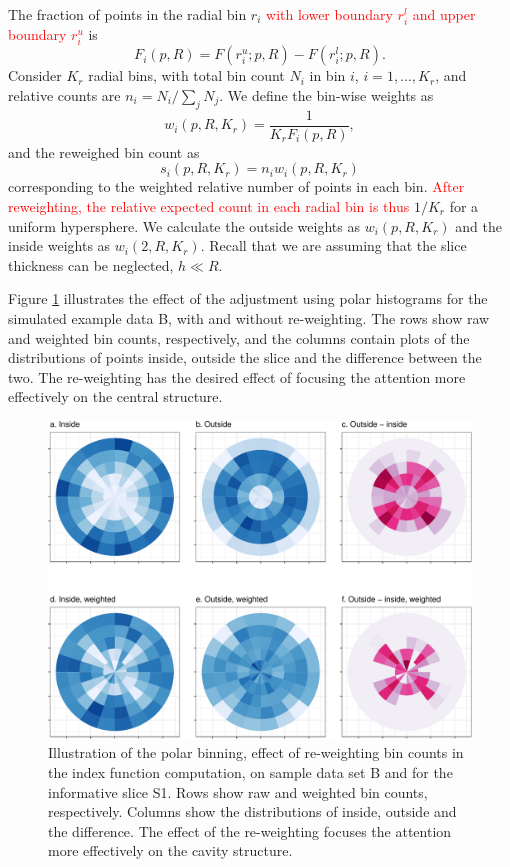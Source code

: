 \documentclass[]{interact}
\theoremstyle{plain}%
\theoremstyle{definition}
\theoremstyle{remark}
\begin{document}
The fraction of points in the radial bin \(r_i\)
\textcolor{red}{with lower boundary $r_i^l$ and upper boundary $r_i^u$}
is \begin{equation}
F_{i}(p, R) = F(r_i^u; p, R) - F(r_i^l; p, R).
\label{eq:frac}
\end{equation} Consider \(K_r\) radial bins, with total bin count
\(N_i\) in bin \(i\), \(i = 1,...,K_r\), and relative counts are
\(n_i = N_i / \sum_j N_j\). We define the bin-wise weights as
\begin{equation}
w_i(p, R, K_r) = \frac{1}{K_r F_i(p,R)},
\end{equation} and the reweighed bin count as \begin{equation}
s_i(p, R, K_r) = n_i w_i(p, R, K_r)
\label{eq:reweight}
\end{equation} corresponding to the weighted relative number of points
in each bin.
\textcolor{red}{After reweighting, the relative expected count in each radial bin is thus}
\(1/K_r\) for a uniform hypersphere. We calculate the outside weights as
\(w_i(p, R, K_r)\) and the inside weights as \(w_i(2, R, K_r)\). Recall
that we are assuming that the slice thickness can be neglected,
\(h\ll R\).

Figure \ref{fig:data_and_densities} illustrates the effect of the
adjustment using polar histograms for the simulated example data B, with
and without re-weighting. The rows show raw and weighted bin counts,
respectively, and the columns contain plots of the distributions of
points inside, outside the slice and the difference between the two. The
re-weighting has the desired effect of focusing the attention more
effectively on the central structure.

\begin{figure}

{\centering \includegraphics[width=0.9\linewidth]{section_pursuit_files/figure-latex/data_and_densities-1} 

}

\caption{Illustration of the polar binning, effect of re-weighting bin counts in the index function computation, on sample data set B and for the informative slice S1. Rows show raw and weighted bin counts, respectively. Columns show the distributions of inside, outside and the difference. The effect of the re-weighting focuses the attention more effectively on the cavity structure.}\label{fig:data_and_densities}
\end{figure}
\end{document}
